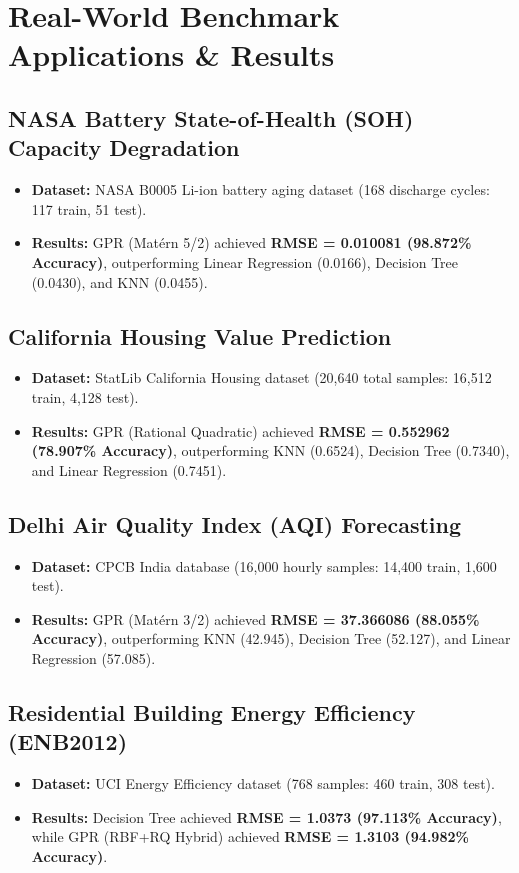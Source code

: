 \documentclass[11pt,a4paper]{article}
\begin{document}
\section{Real-World Benchmark Applications \& Results}

\subsection{NASA Battery State-of-Health (SOH) Capacity Degradation}
\begin{itemize}
  \item \textbf{Dataset:} NASA B0005 Li-ion battery aging dataset (168 discharge cycles: 117 train, 51 test).
  \item \textbf{Results:} GPR (Matérn 5/2) achieved \textbf{RMSE = 0.010081 (98.872\% Accuracy)}, outperforming Linear Regression (0.0166), Decision Tree (0.0430), and KNN (0.0455).
\end{itemize}

\subsection{California Housing Value Prediction}
\begin{itemize}
  \item \textbf{Dataset:} StatLib California Housing dataset (20,640 total samples: 16,512 train, 4,128 test).
  \item \textbf{Results:} GPR (Rational Quadratic) achieved \textbf{RMSE = 0.552962 (78.907\% Accuracy)}, outperforming KNN (0.6524), Decision Tree (0.7340), and Linear Regression (0.7451).
\end{itemize}

\subsection{Delhi Air Quality Index (AQI) Forecasting}
\begin{itemize}
  \item \textbf{Dataset:} CPCB India database (16,000 hourly samples: 14,400 train, 1,600 test).
  \item \textbf{Results:} GPR (Matérn 3/2) achieved \textbf{RMSE = 37.366086 (88.055\% Accuracy)}, outperforming KNN (42.945), Decision Tree (52.127), and Linear Regression (57.085).
\end{itemize}

\subsection{Residential Building Energy Efficiency (ENB2012)}
\begin{itemize}
  \item \textbf{Dataset:} UCI Energy Efficiency dataset (768 samples: 460 train, 308 test).
  \item \textbf{Results:} Decision Tree achieved \textbf{RMSE = 1.0373 (97.113\% Accuracy)}, while GPR (RBF+RQ Hybrid) achieved \textbf{RMSE = 1.3103 (94.982\% Accuracy)}.
\end{itemize}
\end{document}
